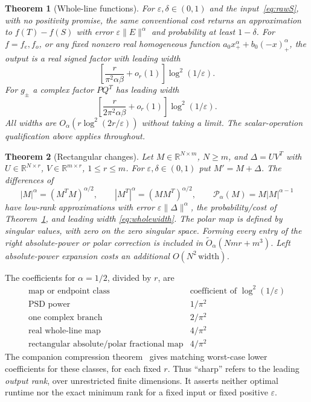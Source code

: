 \documentclass[11pt]{article}
\newtheorem{theorem}{Theorem}[section]
\numberwithin{equation}{section}
\newcommand{\R}{\mathbb R}
\begin{document}
\begin{theorem}[Whole-line functions]\label{thm:whole}
For $\varepsilon,\delta\in(0,1)$ and the input~\eqref{eq:rawS},
with no positivity promise, the same
conventional cost returns an approximation to $f(T)-f(S)$ with error
$\varepsilon\|E\|^\alpha$ and probability at least $1-\delta$.
For $f=f_e,f_o$, or any fixed nonzero real homogeneous function
$a_0x_+^\alpha+b_0(-x)_+^\alpha$, the output is a real signed factor
with leading width
\begin{equation}\label{eq:wholewidth}
 \left[\frac{r}{\pi^2\alpha\beta}+o_r(1)\right]
                              \log^2(1/\varepsilon).
\end{equation}
For $g_\pm$ a complex factor $PQ^T$ has leading width
\begin{equation}\label{eq:branchwidth}
 \left[\frac{r}{2\pi^2\alpha\beta}+o_r(1)\right]
                              \log^2(1/\varepsilon).
\end{equation}
All widths are $O_\alpha(r\log^2(2r/\varepsilon))$ without taking a
limit. The scalar-operation qualification above applies throughout.
\end{theorem}

\begin{theorem}[Rectangular changes]\label{thm:rect}
Let $M\in\R^{N\times m}$, $N\ge m$, and
$\Delta=UV^T$ with $U\in\R^{N\times r}$, $V\in\R^{m\times r}$,
$1\le r\le m$. For $\varepsilon,\delta\in(0,1)$ put
$M'=M+\Delta$. The differences of
\[
 |M|^\alpha=(M^TM)^{\alpha/2},\qquad
 |M^T|^\alpha=(MM^T)^{\alpha/2},\qquad
 \mathcal P_\alpha(M)=M|M|^{\alpha-1}
\]
have low-rank approximations with error $\varepsilon\|\Delta\|^\alpha$,
the probability/cost of Theorem~\ref{thm:whole}, and leading width
\eqref{eq:wholewidth}. The polar map is defined by singular values,
with zero on the zero singular space. Forming every entry of the right
absolute-power or polar correction is included in
$\widetilde O_\alpha(Nmr+m^3)$. Left absolute-power expansion costs
an additional $O(N^2\,\mathrm{width})$.
\end{theorem}

The coefficients for $\alpha=1/2$, divided by $r$, are
\[
\begin{array}{c|c}
 \text{map or endpoint class}&\text{coefficient of }\log^2(1/\varepsilon)\\ \hline
 \text{PSD power}&1/\pi^2\\
 \text{one complex branch}&2/\pi^2\\
 \text{real whole-line map}&4/\pi^2\\
 \text{rectangular absolute/polar fractional map}&4/\pi^2
\end{array}
\]
The companion compression theorem~\cite{Sharp,Extensions} gives matching
worst-case lower coefficients for these classes, for each fixed $r$.
Thus ``sharp'' refers to the leading \emph{output rank}, over unrestricted
finite dimensions. It asserts neither optimal runtime nor the exact
minimum rank for a fixed input or fixed positive $\varepsilon$.
\end{document}
